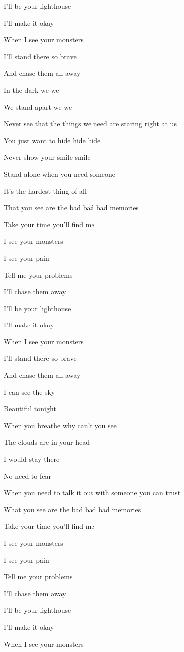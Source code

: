 \documentclass[
]{book}
\begin{document}
I'll be your lighthouse

I'll make it okay

When I see your monsters

I'll stand there so brave

And chase them all away

In the dark we we

We stand apart we we

Never see that the things we need are staring right at us

You just want to hide hide hide

Never show your smile smile

Stand alone when you need someone

It's the hardest thing of all

That you see are the bad bad bad memories

Take your time you'll find me

I see your monsters

I see your pain

Tell me your problems

I'll chase them away

I'll be your lighthouse

I'll make it okay

When I see your monsters

I'll stand there so brave

And chase them all away

I can see the sky

Beautiful tonight

When you breathe why can't you see

The clouds are in your head

I would stay there

No need to fear

When you need to talk it out with someone you can trust

What you see are the bad bad bad memories

Take your time you'll find me

I see your monsters

I see your pain

Tell me your problems

I'll chase them away

I'll be your lighthouse

I'll make it okay

When I see your monsters
\end{document}
